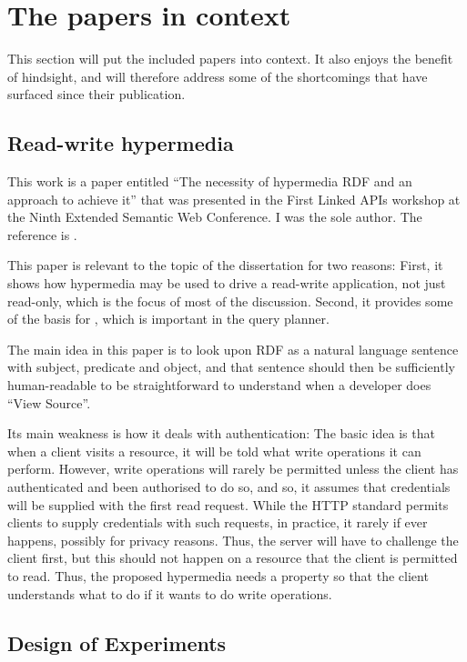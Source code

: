 \section{The papers in context}

This section will put the included papers into context. It also enjoys
the benefit of hindsight, and will therefore address some of the
shortcomings that have surfaced since their publication.

\subsection{Read-write hypermedia}\label{sec:conlapis}

This work is a paper entitled ``The necessity of hypermedia RDF and an
approach to achieve it'' that was presented in the First Linked APIs
workshop at the Ninth Extended Semantic Web Conference. I was the sole
author. The reference is \cite{kjernsmo_lapis_2012}.


This paper is relevant to the topic of the dissertation for two
reasons: First, it shows how hypermedia may be used to drive a
read-write application, not just read-only, which is the focus of most
of the discussion. Second, it provides some of the basis for
\cite{ldf1}, which is important in the query planner.

The main idea in this paper is to look upon RDF as a natural language
sentence with subject, predicate and object, and that sentence should
then be sufficiently human-readable to be straightforward to
understand when a developer does ``View Source''.

Its main weakness is how it deals with authentication: The basic idea
is that when a client visits a resource, it will be told what
write operations it can perform. However, write operations will rarely
be permitted unless the client has authenticated and been authorised
to do so, and so, it assumes that credentials will be supplied with
the first read request. While the HTTP standard permits clients to
supply credentials with such requests, in practice, it rarely if ever
happens, possibly for privacy reasons. Thus, the server will have to
challenge the client first, but this should not happen on a resource
that the client is permitted to read. Thus, the proposed hypermedia
needs a property so that the client understands what to do if it wants
to do write operations.

\subsection{Design of Experiments}\label{sec:condoe}

